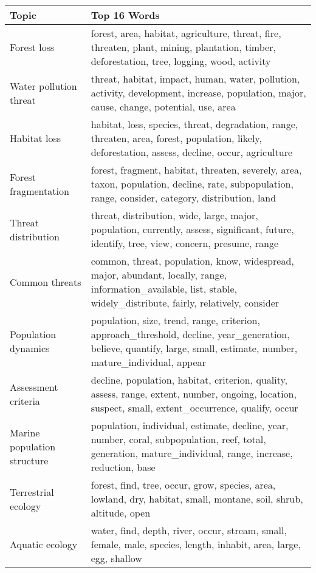 \begin{table}[!hbtp]
\centering
    \small
    \begin{tabulary}{1.0\textwidth}{L L}
        \hline
        Topic & Top 16 Words\\
        \hline
        Forest loss & forest, area, habitat, agriculture, threat, fire, threaten, plant, mining, plantation, timber, deforestation, tree, logging, wood, activity\\
        \hline
        Water pollution threat & threat, habitat, impact, human, water, pollution, activity, development, increase, population, major, cause, change, potential, use, area\\
        \hline
        Habitat loss & habitat, loss, species, threat, degradation, range, threaten, area, forest, population, likely, deforestation, assess, decline, occur, agriculture\\
        \hline
        Forest fragmentation & forest, fragment, habitat, threaten, severely, area, taxon, population, decline, rate, subpopulation, range, consider, category, distribution, land\\
        \hline
        Threat distribution & threat, distribution, wide, large, major, population, currently, assess, significant, future, identify, tree, view, concern, presume, range\\
        \hline
        Common threats & common, threat, population, know, widespread, major, abundant, locally, range, information\_available, list, stable, widely\_distribute, fairly, relatively, consider\\
        \hline
        Population dynamics & population, size, trend, range, criterion, approach\_threshold, decline, year\_generation, believe, quantify, large, small, estimate, number, mature\_individual, appear\\
        \hline
        Assessment criteria & decline, population, habitat, criterion, quality, assess, range, extent, number, ongoing, location, suspect, small, extent\_occurrence, qualify, occur\\
        \hline
        Marine population structure & population, individual, estimate, decline, year, number, coral, subpopulation, reef, total, generation, mature\_individual, range, increase, reduction, base\\
        \hline
        Terrestrial ecology & forest, find, tree, occur, grow, species, area, lowland, dry, habitat, small, montane, soil, shrub, altitude, open\\
        \hline
        Aquatic ecology & water, find, depth, river, occur, stream, small, female, male, species, length, inhabit, area, large, egg, shallow\\

\end{tabulary}
\end{table}
